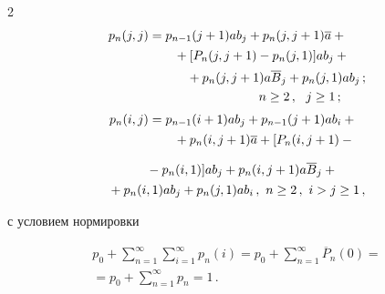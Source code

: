 \begin{multicols}{2}
\begin{align}
p_{n}(j,j) & = p_{n-1}(j+1) a b_j + p_{n}(j,j+1) \a +{}\notag\\[1pt]


&\hspace*{20pt}{}+[P_n(j,j+1) - p_{n}(j,1)] a b_j +{}\notag\\[1pt]


&\hspace*{30pt}{}+ p_{n}(j,j+1) a \overline B_j +


p_n(j,1)ab_j\,;\notag\\


&\hspace*{40pt}\ \ \ \ \ \ \ \ \ \ \ \  \ \ n\ge 2\,,\ \ j\ge 1\,; \label{e28p}\\[3pt]


p_{n}(i,j) & = p_{n-1}(i+1) a b_j + p_{n-1}(j+1) a b_i +{}\notag\\[1pt]


&\hspace*{20pt}{}+p_{n}(i,j+1) \a + [P_n(i,j+1) - {}\notag %


\end{align}


\begin{align}


&\hspace*{30pt}{}-p_{n}(i,1)] a b_j +


p_{n}(i,j+1) a \overline B_j +{}\notag\\[1pt]


&{}+ p_n(i,1)ab_j +


p_n(j,1)ab_i\,, \  n\ge 2\,,\  i>j\ge 1\,, \label{e29p}


\end{align}


с условием нормировки


\begin{multline}


p_0 + \sum\limits_{n=1}^\infty


\sum\limits_{i=1}^\infty p_n(i)


= p_0 + \sum\limits_{n=1}^\infty \overline P_{n}(0)


=\\


{}= p_0 + \sum\limits_{n=1}^\infty p_{n} = 1\,.


\label{e30p}


\end{multline}






\end{multicols}

